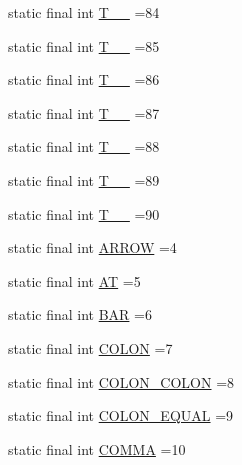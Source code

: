 \begin{DoxyCompactItemize}
\item 
static final int \hyperlink{classorg_1_1tzi_1_1use_1_1parser_1_1soil_1_1_soil_lexer_acca20d140f4cc4df82b03880440ed741}{T\-\_\-\-\_} =84
\item 
static final int \hyperlink{classorg_1_1tzi_1_1use_1_1parser_1_1soil_1_1_soil_lexer_a4af7f24bb1830ceaee0d7e9ab961422d}{T\-\_\-\-\_} =85
\item 
static final int \hyperlink{classorg_1_1tzi_1_1use_1_1parser_1_1soil_1_1_soil_lexer_a9047bf818529075b449a40b440823144}{T\-\_\-\-\_} =86
\item 
static final int \hyperlink{classorg_1_1tzi_1_1use_1_1parser_1_1soil_1_1_soil_lexer_aa2d8e029740dfb0792a69b0a1d5305e4}{T\-\_\-\-\_} =87
\item 
static final int \hyperlink{classorg_1_1tzi_1_1use_1_1parser_1_1soil_1_1_soil_lexer_afdc0f2be5ee8ef9f2b32e2df41d3cf9b}{T\-\_\-\-\_} =88
\item 
static final int \hyperlink{classorg_1_1tzi_1_1use_1_1parser_1_1soil_1_1_soil_lexer_ad74480867a0b51a6228f9d760032cf36}{T\-\_\-\-\_} =89
\item 
static final int \hyperlink{classorg_1_1tzi_1_1use_1_1parser_1_1soil_1_1_soil_lexer_ad8b39882c5cc85dfb784f1a376514711}{T\-\_\-\-\_} =90
\item 
static final int \hyperlink{classorg_1_1tzi_1_1use_1_1parser_1_1soil_1_1_soil_lexer_a9d4b3804a2c227d6651b402216f6f509}{A\-R\-R\-O\-W} =4
\item 
static final int \hyperlink{classorg_1_1tzi_1_1use_1_1parser_1_1soil_1_1_soil_lexer_afdbb3c34b12626a91b65c0509f0f2a43}{A\-T} =5
\item 
static final int \hyperlink{classorg_1_1tzi_1_1use_1_1parser_1_1soil_1_1_soil_lexer_af63e25774e7254887133bec45d33c9f4}{B\-A\-R} =6
\item 
static final int \hyperlink{classorg_1_1tzi_1_1use_1_1parser_1_1soil_1_1_soil_lexer_aeadcb753f15f01aeca7fa707c504c9b7}{C\-O\-L\-O\-N} =7
\item 
static final int \hyperlink{classorg_1_1tzi_1_1use_1_1parser_1_1soil_1_1_soil_lexer_a193c69032bae1b3fb3cbc6574c7b8b3c}{C\-O\-L\-O\-N\-\_\-\-C\-O\-L\-O\-N} =8
\item 
static final int \hyperlink{classorg_1_1tzi_1_1use_1_1parser_1_1soil_1_1_soil_lexer_ae63465de0d448065566531e21114bb6a}{C\-O\-L\-O\-N\-\_\-\-E\-Q\-U\-A\-L} =9
\item 
static final int \hyperlink{classorg_1_1tzi_1_1use_1_1parser_1_1soil_1_1_soil_lexer_a775a15378d8e0dba9f116e3d275ef9e7}{C\-O\-M\-M\-A} =10

\end{DoxyCompactItemize}

